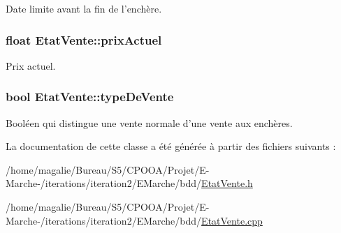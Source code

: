 Date limite avant la fin de l'enchère. 

\hypertarget{class_etat_vente_a69258e9f4890fc1fe84e5afdba35bc0f}{
\subsubsection[{prix\-Actuel}]{\setlength{\rightskip}{0pt plus 5cm}float Etat\-Vente\-::prix\-Actuel\hspace{0.3cm}{\ttfamily [protected]}}}\label{class_etat_vente_a69258e9f4890fc1fe84e5afdba35bc0f}


Prix actuel. 

\hypertarget{class_etat_vente_a6fac909bb6c53a68450ff1f1e287e298}{
\subsubsection[{type\-De\-Vente}]{\setlength{\rightskip}{0pt plus 5cm}bool Etat\-Vente\-::type\-De\-Vente\hspace{0.3cm}{\ttfamily [protected]}}}\label{class_etat_vente_a6fac909bb6c53a68450ff1f1e287e298}


Booléen qui distingue une vente normale d'une vente aux enchères. 



La documentation de cette classe a été générée à partir des fichiers suivants \-:\begin{DoxyCompactItemize}
\item 
/home/magalie/\-Bureau/\-S5/\-C\-P\-O\-O\-A/\-Projet/\-E-\/\-Marche-\//iterations/iteration2/\-E\-Marche/bdd/\hyperlink{_etat_vente_8h}{Etat\-Vente.\-h}\item 
/home/magalie/\-Bureau/\-S5/\-C\-P\-O\-O\-A/\-Projet/\-E-\/\-Marche-\//iterations/iteration2/\-E\-Marche/bdd/\hyperlink{_etat_vente_8cpp}{Etat\-Vente.\-cpp}\end{DoxyCompactItemize}
